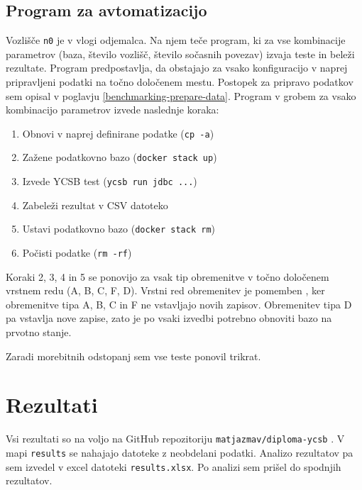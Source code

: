 \documentclass[a4paper, 12pt]{book}
\begin{document}
\subsection{Program za avtomatizacijo}
Vozlišče \texttt{n0} je v vlogi odjemalca. Na njem teče program, ki za vse kombinacije parametrov (baza, število vozlišč, število sočasnih povezav) izvaja teste in beleži rezultate. Program predpostavlja, da obstajajo za vsako konfiguracijo v naprej pripravljeni podatki na točno določenem mestu. Postopek za pripravo podatkov sem opisal v poglavju \ref{benchmarking-prepare-data}. Program v grobem za vsako kombinacijo parametrov izvede naslednje koraka:
\begin{enumerate}
    \item Obnovi v naprej definirane podatke (\texttt{cp -a})
    \item Zažene podatkovno bazo (\texttt{docker stack up})
    \item Izvede YCSB test (\texttt{ycsb run jdbc ...})
    \item Zabeleži rezultat v CSV datoteko
    \item Ustavi podatkovno bazo (\texttt{docker stack rm})
    \item Počisti podatke (\texttt{rm -rf})
\end{enumerate}

Koraki 2, 3, 4 in 5 se ponovijo za vsak tip obremenitve v točno določenem vrstnem redu (A, B, C, F, D). Vrstni red obremenitev je pomemben \cite{YCSB-core-workloads}, ker obremenitve tipa A, B, C in F ne vstavljajo novih zapisov. Obremenitev tipa D pa vstavlja nove zapise, zato je po vsaki izvedbi potrebno obnoviti bazo na prvotno stanje.

Zaradi morebitnih odstopanj sem vse teste ponovil trikrat.

\section{Rezultati}
Vsi rezultati so na voljo na GitHub repozitoriju \texttt{matjazmav/diploma-ycsb} \cite{matjazmav/diploma-ycsb}. V mapi \texttt{results} se nahajajo datoteke z neobdelani podatki. Analizo rezultatov pa sem izvedel v excel datoteki \texttt{results.xlsx}. Po analizi sem prišel do spodnjih rezultatov.

\newpage
\end{document}
